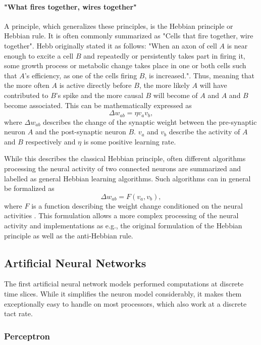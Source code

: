 \paragraph{"What fires together, wires together"} \label{c:hebb}
A principle, which generalizes these principles, is the Hebbian principle or Hebbian rule.
It is often commonly summarized as "Cells that fire together, wire together".
Hebb originally stated it as follows: "When an axon of cell $A$ is near enough to excite a cell $B$ and repeatedly or persistently takes part in firing it, some growth process or metabolic change takes place in one or both cells such that $A$'s efficiency, as one of the cells firing $B$, is increased."\cite{hebb19680}.
Thus, meaning that the more often $A$ is active directly before $B$, the more likely $A$ will have contributed to $B$'s spike and the more causal $B$ will become of $A$ and $A$ and $B$ become associated.
This can be mathematically expressed as
\[
\Delta w_{ab} = \eta v_a v_b ,
\]
where $\Delta w_{ab}$ describes the change of the synaptic weight between the pre-synaptic neuron $A$ and the post-synaptic neuron $B$. 
$v_a$ and $v_b$ describe the activity of $A$ and $B$ respectively and $\eta$ is some positive learning rate. 

While this describes the classical Hebbian principle, often different algorithms processing the neural activity of two connected neurons are summarized and labelled as general Hebbian learning algorithms.
Such algorithms can in general be formalized as
\[
\Delta w_{ab} = F( v_a, v_b) , 
\]
where $F$ is a function describing the weight change conditioned on the neural activities \cite{gerstner2014neuronal}.     
This formulation allows a more complex processing of the neural activity and implementations as e.g., the original formulation of the Hebbian principle as well as the anti-Hebbian rule. 

\subsection{Artificial Neural Networks} \label{c:ann}

The first artificial neural network models performed computations at discrete time slices.
While it simplifies the neuron model considerably, it makes them exceptionally easy to handle on most processors, which also work at a discrete tact rate.

\subsubsection{Perceptron} \label{c:perceptron}

